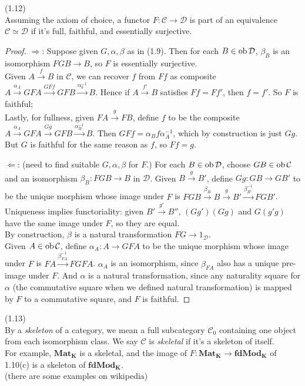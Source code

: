 \documentclass[a4paper]{article}
\begin{document}
\begin{lemma} (1.12)\\
    Assuming the axiom of choice, a functor $F:\mathcal{C} \to \mathcal{D}$ is part of an equivalence $\mathcal{C} \simeq \mathcal{D}$ if it's full, faithful, and essentially surjective.
    \begin{proof}
        $\Rightarrow$: Suppose given $G,\alpha,\beta$ as in (1.9). Then for each $B \in \operatorname{ob}\mathcal{D}$, $\beta_B$ is an isomorphism $FGB \to B$, so $F$ is essentially surjective.\\
        Given $A \xrightarrow{f} B$ in $\mathcal{C}$, we can recover $f$ from $Ff$ as composite $A \xrightarrow{\alpha_A} GFA \xrightarrow{GFf} GFB \xrightarrow{\alpha_b^{-1}} B$. Hence if $A \xrightarrow{f'}B$ satisfies $Ff = Ff'$, then $f=f'$. So $F$ is faithful;\\
        Lastly, for fullness, given $FA \xrightarrow{g} FB$, define $f$ to be the composite $A \xrightarrow {\alpha_A} GFA \xrightarrow{Gg} GFB \xrightarrow{\alpha_B^{-1}} B$. Then $GFf = \alpha_B f \alpha_A^{-1}$, which by construction is just $Gg$. But $G$ is faithful for the same reason as $f$, so $Ff = g$.

        $\Leftarrow$: (need to find suitable $G,\alpha,\beta$ for $F$.) For each $B \in \operatorname{ob} \mathcal{D}$, choose $GB \in \operatorname{ob} \mathcal{C}$ and an isomorphism $\beta_B : FGB \to B$ in $\mathcal{D}$. Given $B \xrightarrow{g} B'$, define $Gg:GB \to GB'$ to be the unique morphism whose image under $F$ is $FGB \xrightarrow{\beta_B} B \xrightarrow{g} B' \xrightarrow{\beta_{B'}^{-1}} FGB'$.\\
        Uniqueness implies functoriality: given $B' \xrightarrow{g'} B''$, $(Gg')(Gg)$ and $G(g'g)$ have the same image under $F$, so they are equal.\\
        By construction, $\beta$ is a natural transformation $FG \to 1_\mathcal{D}$.\\
        Given $A \in \operatorname{ob} \mathcal{C}$, define $\alpha_A: A \to GFA$ to be the unique morphism whose image under $F$ is $FA \xrightarrow{\beta_{FA}^{-1}} FGFA$. $\alpha_A$ is an isomorphism, since $\beta_{FA}$ also has a unique pre-image under $F$. And $\alpha$ is a natural transformation, since any naturality square for $\alpha$ (the commutative square when we defined natural transformation) is mapped by $F$ to a commutative square, and $F$ is faithful.
    \end{proof}
\end{lemma}

\begin{defi} (1.13) \\
    By a \emph{skeleton} of a category, we mean a full subcategory $\mathcal{C}_0$ containing one object from each isomorphism class. We say $\mathcal{C}$ is \emph{skeletal} if it's a skeleton of itself.\\
    For example, $\mathbf{Mat_K}$ is a skeletal, and the image of $F:\mathbf{Mat_K} \to \mathbf{fdMod_K}$ of 1.10(c) is a skeleton of $\mathbf{fdMod_K}$.\\
    (there are some examples on wikipedia)
\end{defi}
\end{document}
